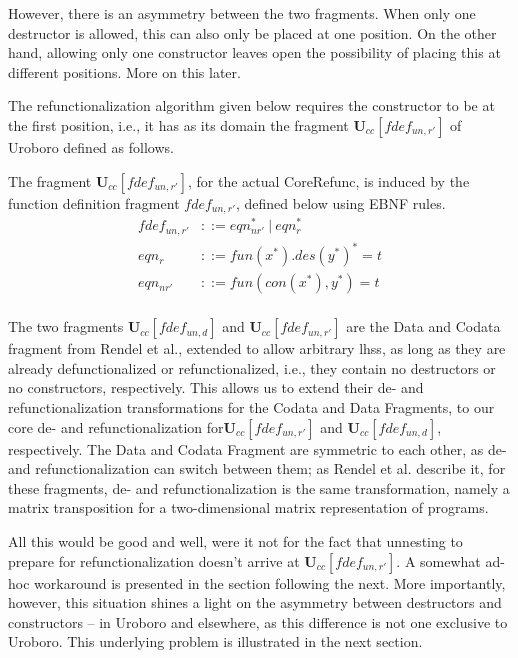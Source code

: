 However, there is an asymmetry between the two fragments. When only one destructor is allowed, this can also only be placed at one position. On the other hand, allowing only one constructor leaves open the possibility of placing this at different positions. More on this later.

The refunctionalization algorithm given below requires the constructor to be at the first position, i.e., it has as its domain the fragment $\mathbf{U}_{cc}[fdef_{un,r'}]$ of Uroboro defined as follows.

\begin{definition}
The fragment $\mathbf{U}_{cc}[fdef_{un,r'}]$, for the actual \textsf{CoreRefunc}, is induced by the function definition fragment $fdef_{un,r'}$, defined below using EBNF rules.
\begin{align*}
fdef_{un,r'} &::= eqn_{nr'}^* ~ | ~ eqn_r^* \\
eqn_r &::= fun(x^*).des(y^*)^* = t \\
eqn_{nr'} &::= fun(con(x^*), y^*) = t \\
\end{align*}
\end{definition}

The two fragments $\mathbf{U}_{cc}[fdef_{un,d}]$ and $\mathbf{U}_{cc}[fdef_{un,r'}]$ are the Data and Codata fragment from Rendel et al., extended to allow arbitrary lhss, as long as they are already defunctionalized or refunctionalized, i.e., they contain no destructors or no constructors, respectively. This allows us to extend their de- and refunctionalization transformations for the Codata and Data Fragments, to our core de- and refunctionalization for$\mathbf{U}_{cc}[fdef_{un,r'}]$ and $\mathbf{U}_{cc}[fdef_{un,d}]$, respectively. The Data and Codata Fragment are symmetric to each other, as de- and refunctionalization can switch between them; as Rendel et al. describe it, for these fragments, de- and refunctionalization is the same transformation, namely a matrix transposition for a two-dimensional matrix representation of programs.

All this would be good and well, were it not for the fact that unnesting to prepare for refunctionalization doesn't arrive at $\mathbf{U}_{cc}[fdef_{un,r'}]$. A somewhat ad-hoc workaround is presented in the section following the next. More importantly, however, this situation shines a light on the asymmetry between destructors and constructors -- in Uroboro and elsewhere, as this difference is not one exclusive to Uroboro. This underlying problem is illustrated in the next section.

